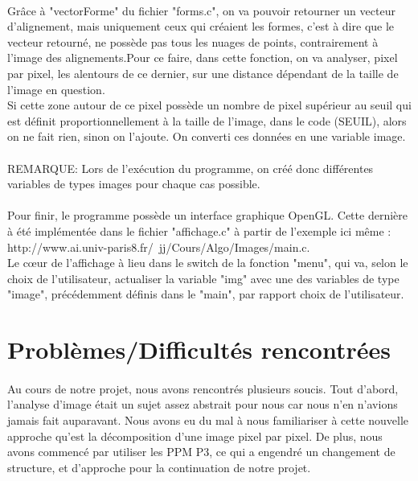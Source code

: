 \documentclass[a4paper , 10pt]{article}
\begin{document}
\paragraph{}
Grâce à "vectorForme" du fichier "forms.c", on va pouvoir retourner un vecteur d'alignement, mais uniquement ceux qui créaient les formes, c'est à dire que le vecteur retourné, ne possède pas tous les nuages de points, contrairement à l'image des alignements.Pour ce faire, dans cette fonction, on va analyser, pixel par pixel, les alentours de ce dernier, sur une distance dépendant de la taille de l'image en question.\\
Si cette zone autour de ce pixel possède un nombre de pixel supérieur au seuil qui est définit proportionnellement à la taille de l'image, dans le code (SEUIL), alors on ne fait rien, sinon on l'ajoute. On converti ces données en une variable image.\\\\REMARQUE: Lors de l’exécution du programme, on créé donc différentes variables de types images pour chaque cas possible.
\paragraph{}
Pour finir, le programme possède un interface graphique OpenGL. Cette dernière à été implémentée dans le fichier "affichage.c" à partir de l'exemple ici même : http://www.ai.univ-paris8.fr/~jj/Cours/Algo/Images/main.c. \\
Le cœur de l'affichage à lieu dans le switch de la fonction "menu", qui va, selon le choix de l'utilisateur, actualiser la variable "img" avec une des variables de type "image", précédemment définis dans le "main", par rapport choix de l'utilisateur.
\section{Problèmes/Difficultés rencontrées}
\paragraph{}
Au cours de notre projet, nous avons rencontrés plusieurs soucis. Tout d'abord, l'analyse d'image était un sujet assez abstrait pour nous car nous n'en n'avions jamais fait auparavant. Nous avons eu du mal à nous familiariser à cette nouvelle approche qu'est la décomposition d'une image pixel par pixel. De plus, nous avons commencé par utiliser les PPM P3, ce qui a engendré un changement de structure, et d'approche pour la continuation de notre projet.
\end{document}
